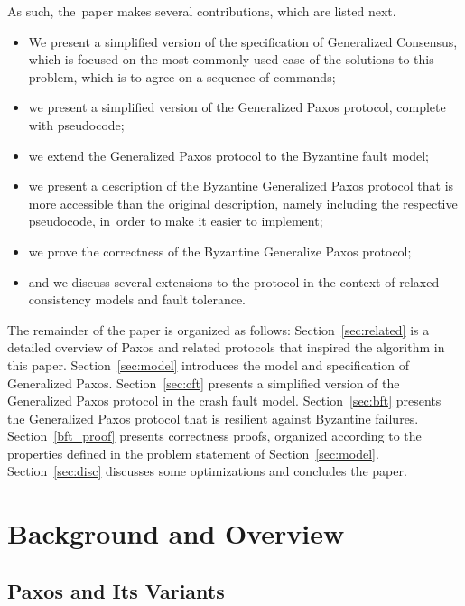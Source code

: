 \documentclass[algorithms,article,accept,moreauthors,pdftex,10pt,a4paper]{Definitions/mdpi}
\begin{document}
As such, the~paper makes several contributions, which are listed next.
%
\begin{itemize}
\item
We present a simplified version of the specification of Generalized
Consensus, which is focused on the most commonly used case of the
solutions to this problem, which is to agree on a sequence of
commands;

\item 
we present a simplified version of the Generalized Paxos protocol, complete with pseudocode;

\item
we extend the Generalized Paxos protocol to the Byzantine fault model; 

\item
we present a description of the Byzantine Generalized Paxos protocol
that is more accessible than the original description, namely including the
respective pseudocode, in~order to make it easier to implement;

\item
we prove the correctness of the Byzantine Generalize Paxos protocol;

\item
and we discuss several extensions to the protocol in the context of relaxed consistency models and fault tolerance.

\end{itemize}

The remainder of the paper is organized as follows: 
Section~\ref{sec:related} is a detailed overview of Paxos and related protocols that inspired the algorithm in this paper.
Section~\ref{sec:model} introduces the model and specification of Generalized Paxos.
Section~\ref{sec:cft} presents a simplified version of the Generalized Paxos protocol in the crash fault model. Section~\ref{sec:bft} presents the Generalized Paxos protocol that is resilient against Byzantine failures. Section~\ref{bft_proof} presents correctness proofs, organized according to the properties defined in the problem statement of Section~\ref{sec:model}. Section~\ref{sec:disc} discusses some optimizations and concludes the paper.

%
\section{Background and Overview\label{sec:related} }
\unskip
\subsection{Paxos and Its Variants \label{Paxos}}
\unskip
\end{document}
